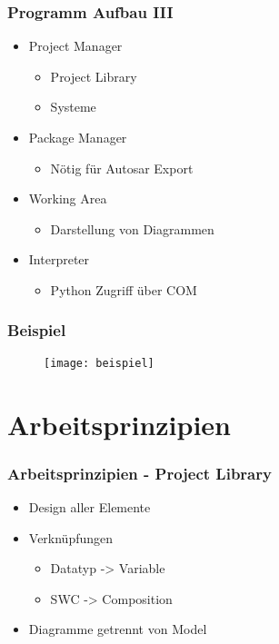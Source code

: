 \documentclass[]{beamer}
\begin{document}
\begin{frame}
\frametitle{Programm Aufbau III}
    \begin{itemize}
    \item Project Manager
    \begin{itemize}
        \item Project Library
        \item Systeme
    \end{itemize}
    \item Package Manager
    \begin{itemize}
        \item Nötig für Autosar Export
    \end{itemize}
    \item Working Area
    \begin{itemize}
        \item Darstellung von Diagrammen
    \end{itemize}
    \item Interpreter
    \begin{itemize}
        \item Python Zugriff über COM
    \end{itemize}
    \end{itemize}
\end{frame}




\begin{frame}
\frametitle{Beispiel}
    \begin{figure}
       \texttt{[image: beispiel]}
    \end{figure}
\end{frame}



\section{Arbeitsprinzipien}
\label{sec:arbeitsprinzipien}

\begin{frame}
\frametitle{Arbeitsprinzipien - Project Library}
    \begin{itemize}
    \item Design aller Elemente
    \item Verknüpfungen
    \begin{itemize}
        \item Datatyp -> Variable
        \item SWC -> Composition
    \end{itemize}
    \item Diagramme getrennt von Model
    \end{itemize}
\end{frame}
\end{document}
